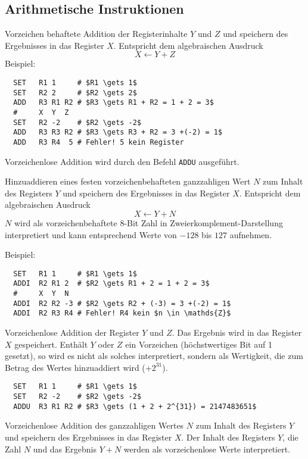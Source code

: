 \subsection{Arithmetische Instruktionen} 

Vorzeichen behaftete Addition der Registerinhalte $Y$ und $Z$ und
speichern des Ergebnisses in das Register $X$. Entspricht dem algebraischen
Ausdruck
\[
    X \gets Y + Z
\]
Beispiel:
\begin{lstlisting}
  SET   R1 1     # $R1 \gets 1$
  SET   R2 2     # $R2 \gets 2$
  ADD   R3 R1 R2 # $R3 \gets R1 + R2 = 1 + 2 = 3$
  #     X  Y  Z
  SET   R2 -2    # $R2 \gets -2$
  ADD   R3 R3 R2 # $R3 \gets R3 + R2 = 3 +(-2) = 1$
  ADD   R3 R4  5 # Fehler! 5 kein Register
\end{lstlisting}
Vorzeichenlose Addition wird durch den Befehl \texttt{ADDU} ausgeführt.



Hinzuaddieren eines festen vorzeichenbehafteten ganzzahligen Wert $N$ zum Inhalt
des Registers $Y$ und speichern des Ergebnisses in das Register $X$.
Entspricht dem algebraischen Ausdruck
\[
  X \gets Y + N
\]
$N$ wird als vorzeichenbehaftete 8-Bit Zahl in Zweierkomplement-Darstellung
interpretiert und kann entsprechend Werte von $-128$ bis $127$ aufnehmen.

Beispiel:
\begin{lstlisting}
  SET   R1 1     # $R1 \gets 1$
  ADDI  R2 R1 2  # $R2 \gets R1 + 2 = 1 + 2 = 3$
  #     X  Y  N
  ADDI  R2 R2 -3 # $R2 \gets R2 + (-3) = 3 +(-2) = 1$
  ADDI  R2 R3 R4 # Fehler! R4 kein $n \in \mathds{Z}$
\end{lstlisting}



Vorzeichenlose Addition der Register $Y$ und $Z$. Das Ergebnis wird in das
Register $X$ gespeichert. Enthält $Y$ oder $Z$ ein Vorzeichen (höchstwertiges
Bit auf 1 gesetzt), so wird es nicht als solches interpretiert, sondern als
Wertigkeit, die zum Betrag des Wertes hinzuaddiert wird ($+2^{31}$).

\begin{lstlisting}
  SET   R1 1     # $R1 \gets 1$
  SET   R2 -2    # $R2 \gets -2$
  ADDU  R3 R1 R2 # $R3 \gets (1 + 2 + 2^{31}) = 2147483651$
\end{lstlisting}



Vorzeichenlose Addition des ganzzahligen Wertes $N$ zum Inhalt des Registers $Y$
und speichern des Ergebnisses in das Register $X$.
Der Inhalt des Registers $Y$, die Zahl $N$ und das Ergebnis $Y + N$ werden als
vorzeichenlose Werte interpretiert.


